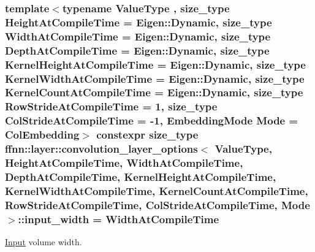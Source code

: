 \hypertarget{structffnn_1_1layer_1_1convolution__layer__options_ad08e81ef0c9d1a0b2687a0f07d0c2104}{
\subsubsection[{input\-\_\-width}]{\setlength{\rightskip}{0pt plus 5cm}template$<$typename Value\-Type , size\-\_\-type Height\-At\-Compile\-Time = Eigen\-::\-Dynamic, size\-\_\-type Width\-At\-Compile\-Time = Eigen\-::\-Dynamic, size\-\_\-type Depth\-At\-Compile\-Time = Eigen\-::\-Dynamic, size\-\_\-type Kernel\-Height\-At\-Compile\-Time = Eigen\-::\-Dynamic, size\-\_\-type Kernel\-Width\-At\-Compile\-Time = Eigen\-::\-Dynamic, size\-\_\-type Kernel\-Count\-At\-Compile\-Time = Eigen\-::\-Dynamic, size\-\_\-type Row\-Stride\-At\-Compile\-Time = 1, size\-\_\-type Col\-Stride\-At\-Compile\-Time = -\/1, Embedding\-Mode Mode = Col\-Embedding$>$ constexpr {\bf size\-\_\-type} {\bf ffnn\-::layer\-::convolution\-\_\-layer\-\_\-options}$<$ Value\-Type, Height\-At\-Compile\-Time, Width\-At\-Compile\-Time, Depth\-At\-Compile\-Time, Kernel\-Height\-At\-Compile\-Time, Kernel\-Width\-At\-Compile\-Time, Kernel\-Count\-At\-Compile\-Time, Row\-Stride\-At\-Compile\-Time, Col\-Stride\-At\-Compile\-Time, Mode $>$\-::input\-\_\-width = Width\-At\-Compile\-Time\hspace{0.3cm}{\ttfamily [static]}}}\label{structffnn_1_1layer_1_1convolution__layer__options_ad08e81ef0c9d1a0b2687a0f07d0c2104}


\hyperlink{classffnn_1_1layer_1_1_input}{Input} volume width. 


